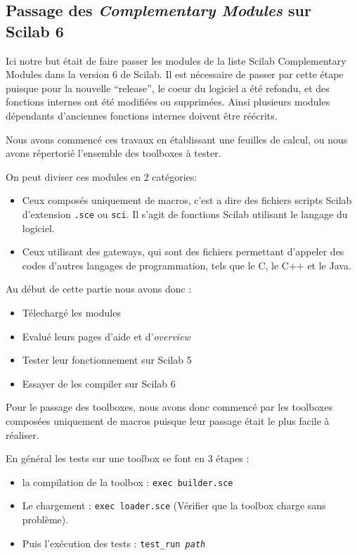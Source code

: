\subsection*{Passage des \textit{Complementary Modules} sur Scilab 6}

Ici notre but était de faire passer les modules de la liste
Scilab Complementary Modules dans la version 6 de Scilab.
Il est nécessaire de passer par cette étape puisque pour la
nouvelle ``release'', le coeur du logiciel a été refondu,
et des fonctions internes ont été modifiées ou supprimées.
Ainsi plusieurs modules dépendants d’anciennes fonctions internes
doivent être réécrits.

Nous avons commencé ces travaux en établissant une feuilles de calcul,
ou nous avons répertori\'e l’ensemble des toolboxes à tester.

On peut diviser ces modules en 2 catégories:

\begin{itemize}
    \item Ceux composés uniquement de macros, c’est a dire
        des fichiers scripts Scilab d’extension {\tt .sce}
        ou {\tt sci}.
        Il s’agit de fonctions Scilab utilisant le langage du logiciel.
    \item Ceux utilisant des gateways, qui sont des fichiers
        permettant d’appeler des codes d’autres langages de
        programmation, tels que le C, le C++ et le Java.
\end{itemize}

Au début de cette partie nous avons donc :

\begin{itemize}
    \item Télechargé les modules
    \item Evalué leurs pages d’aide et d’{\it overview}
    \item Tester leur fonctionnement sur Scilab 5
    \item Essayer de les compiler sur Scilab 6
\end{itemize}

Pour le passage des toolboxes, nous avons donc commencé par
les toolboxes composées uniquement de macros puisque leur
passage était le plus facile à réaliser.

En général les tests sur une toolbox se font en 3 étapes :

\begin{itemize}
    \item la compilation de la toolbox : {\tt exec builder.sce}
    \item Le chargement : {\tt exec loader.sce}
        (V\'erifier que la toolbox charge sans probl\`eme).
    \item Puis l'exécution des tests : \texttt{test\_run \textit{path}}
\end{itemize}

